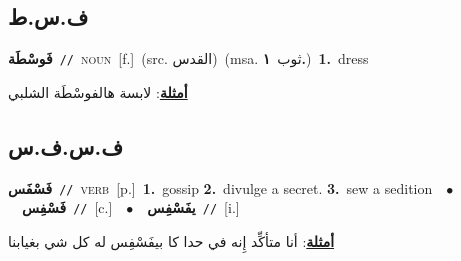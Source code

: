 \documentclass[10pt,a4paper,twoside]{article} %
\begin{document}
\begin{multicols}{2}
\vspace{-3mm}
\subsection*{\color{blue}\foreignlanguage{arabic}{ف.س.ط}\color{blue}{ (ntws)}} 

{\setlength\topsep{0pt}\textbf{\foreignlanguage{arabic}{فَوسْطَة}}\ {\color{gray}\texttt{//}\color{black}}\ \textsc{noun}\ [f.]\ (src. \color{gray}\foreignlanguage{arabic}{القدس}\color{black})\ \color{gray}(msa. \foreignlanguage{arabic}{ثوب}~\foreignlanguage{arabic}{\textbf{١.}})\color{black}\ \textbf{1.}~dress\  \begin{flushright}\color{gray}\foreignlanguage{arabic}{\textbf{\underline{\foreignlanguage{arabic}{أمثلة}}}: لابسة هالفوسْطَة الشلبي}\end{flushright}\color{black}} \vspace{2mm}

\vspace{-3mm}
\subsection*{\color{blue}\foreignlanguage{arabic}{ف.س.ف.س}\color{blue}{}} 

{\setlength\topsep{0pt}\textbf{\foreignlanguage{arabic}{فَسْفَس}}\ {\color{gray}\texttt{//}\color{black}}\ \textsc{verb}\ [p.]\ \textbf{1.}~gossip  \textbf{2.}~divulge a secret.  \textbf{3.}~sew a sedition\ \ $\bullet$\ \ \setlength\topsep{0pt}\textbf{\foreignlanguage{arabic}{فَسْفِس}}\ {\color{gray}\texttt{//}\color{black}}\ [c.]\ \ $\bullet$\ \ \setlength\topsep{0pt}\textbf{\foreignlanguage{arabic}{يفَسْفِس}}\ {\color{gray}\texttt{//}\color{black}}\ [i.]\  \begin{flushright}\color{gray}\foreignlanguage{arabic}{\textbf{\underline{\foreignlanguage{arabic}{أمثلة}}}: أنا متأكِّد إِنه في حدا كا بيفَسْفِس له كل شي بغيابنا}\end{flushright}\color{black}} \vspace{2mm}


\end{multicols}
\end{document}
